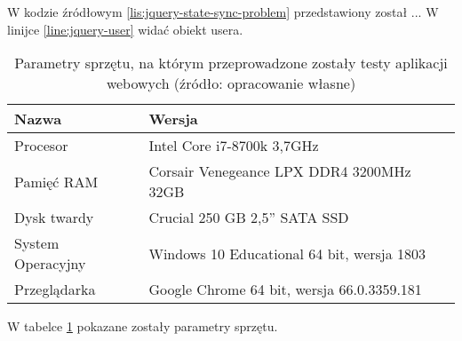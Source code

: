 	W kodzie źródłowym \ref{lis:jquery-state-sync-problem} przedstawiony został ... W linijce \ref{line:jquery-user} widać obiekt usera.
	
\clearpage

\begin{table} %
		\centering
		\caption{Parametry sprzętu, na którym przeprowadzone zostały testy aplikacji webowych (źródło: opracowanie własne)}
		\label{tab:comp-spec}
    	\begin{tabular}{ | l | l |}
    \hline
    Nazwa & Wersja \\ \hline
    Procesor & Intel Core i7-8700k 3,7GHz \\ \hline
    Pamięć RAM & Corsair Venegeance LPX DDR4 3200MHz 32GB \\ \hline
    Dysk twardy & Crucial 250 GB 2,5'' SATA SSD \\ \hline
    System Operacyjny & Windows 10 Educational 64 bit, wersja 1803 \\ \hline
    Przeglądarka & Google Chrome 64 bit, wersja 66.0.3359.181 \\ \hline
    \end{tabular}
\end{table}

	W tabelce \ref{tab:comp-spec} pokazane zostały parametry sprzętu.